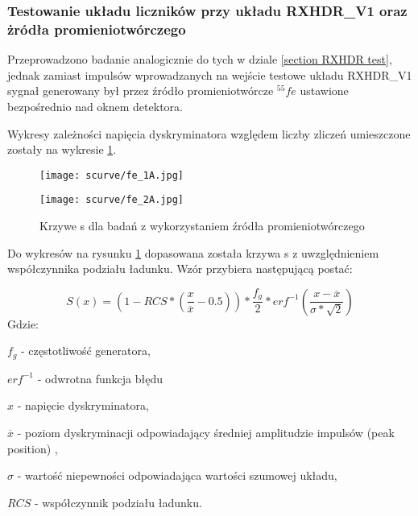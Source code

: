 \subsubsection{Testowanie układu liczników przy układu RXHDR\_V1 oraz żródła promieniotwórczego}
\label{section RXHDR fe}

Przeprowadzono badanie analogicznie do tych w dziale \ref{section RXHDR test}, jednak zamiast impulsów wprowadzanych na wejście testowe układu RXHDR\_V1 sygnał generowany był przez źródło promieniotwórcze ${}^{55}fe$ ustawione bezpośrednio nad oknem detektora. 

Wykresy zależności napięcia dyskryminatora względem liczby zliczeń umieszczone zostały na wykresie \ref{s curve fe}. 

\begin{figure}[]
        \centering
        \begin{multicols}{2}
                \texttt{[image: scurve/fe\_1A.jpg]} \par
                \texttt{[image: scurve/fe\_2A.jpg]} \par
                
        \end{multicols}
        \caption{Krzywe s dla badań z wykorzystaniem źródła promieniotwórczego}
        \label{s curve fe}
\end{figure}

Do wykresów na rysunku \ref{s curve fe} dopasowana została krzywa s z uwzględnieniem współczynnika podziału ładunku. Wzór przybiera następującą postać:

\begin{equation}
        \label{test eq}
        S(x) = (1-RCS * (\frac{x}{\overline{x}}-0.5)) * \frac{f_g}{2} * erf^{-1}(\frac{x-\overline{x}}{\sigma*\sqrt{2}})
\end{equation}
Gdzie:
\begin{description}
        \item $f_g$ - częstotliwość generatora,
        \item $erf^{-1}$ - odwrotna funkcja błędu
        \item $x$ - napięcie dyskryminatora,
        \item $\overline{x}$ - poziom dyskryminacji odpowiadający średniej amplitudzie impulsów (peak position) ,
        \item  $\sigma$ - wartość niepewności odpowiadająca wartości szumowej układu,
        \item $RCS$ -  współczynnik podziału ładunku.
\end{description}


